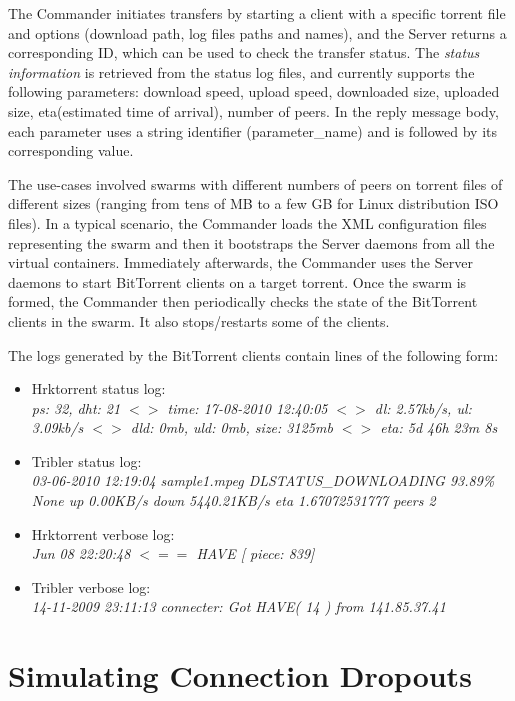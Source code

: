 The Commander initiates transfers by starting a client with a specific torrent
file and options (download path, log files paths and names), and the Server
returns a corresponding ID, which can be used to check the transfer status.
The \textit{status information} is retrieved from the status log files, and
currently supports the following parameters: download speed, upload speed,
downloaded size, uploaded size, eta(estimated time of arrival), number of
peers. In the reply message body, each parameter uses a string identifier
(parameter_name) and is followed by its corresponding value.

The use-cases involved swarms with different numbers of peers on torrent files
of different sizes (ranging from tens of MB to a few GB for Linux distribution
ISO files). In a typical scenario, the Commander loads the XML configuration
files representing the swarm and then it bootstraps the Server daemons from
all the virtual containers. Immediately afterwards, the Commander uses the
Server daemons to start BitTorrent clients on a target torrent. Once the swarm
is formed, the Commander then periodically checks the state of the BitTorrent
clients in the swarm. It also stops/restarts some of the clients.

The logs generated by the BitTorrent clients contain lines of the following
form:

\begin{itemize}
  \item Hrktorrent status log:\\
  \textit{ ps: 32, dht: 21 $<>$ time: 17-08-2010 12:40:05 $<>$ dl: 2.57kb/s,
  ul: 3.09kb/s $<>$ dld: 0mb, uld: 0mb, size: 3125mb $<>$ eta: 5d 46h 23m 8s}
  \item Tribler status log:\\
  \textit{03-06-2010 12:19:04 sample1.mpeg DLSTATUS_DOWNLOADING 93.89\% None
  up 0.00KB/s down  5440.21KB/s eta 1.67072531777 peers 2}
  \item Hrktorrent verbose log:\\
  \textit{Jun 08 22:20:48 $<==$ HAVE [ piece: 839]}
  \item Tribler verbose log:\\
  \textit{14-11-2009 23:11:13 connecter: Got HAVE( 14 ) from 141.85.37.41}
\end{itemize}

\section{Simulating Connection Dropouts}
\label{sec:virt-infra:dropouts}

